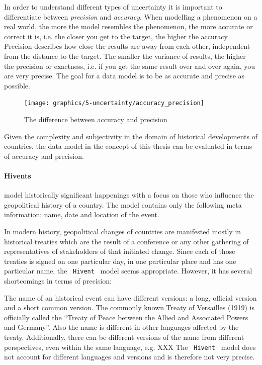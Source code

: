 In order to understand different types of uncertainty it is important to differentiate between \emph{precision} and \emph{accuracy}. When modelling a phenomenon on a real world, the more the model resembles the phenomenon, the more accurate or correct it is, i.e. the closer you get to the target, the higher the accuracy. Precision describes how close the results are away from each other, independent from the distance to the target. The smaller the variance of results, the higher the precision or exactness, i.e. if you get the same result over and over again, you are very precise. The goal for a data model is to be as accurate and precise as possible.

\begin{figure}[ht]
  \centering
  \texttt{[image: graphics/5-uncertainty/accuracy\_precision]}
  \caption{The difference between accuracy and precision}
  \label{fig:accuracy_precision}
\end{figure}

Given the complexity and subjectivity in the domain of historical developments of countries, the data model in the concept of this thesis can be evaluated in terms of accuracy and precision.


\paragraph{Hivents} %
\label{par:evaluation_hivents}

model historically significant happenings with a focus on those who influence the geopolitical history of a country. The model contains only the following meta information: name, date and location of the event.

In modern history, geopolitical changes of countries are manifested mostly in historical treaties which are the result of a conference or any other gathering of representatives of stakeholders of that initiated change. Since each of those treaties is signed on one particular day, in one particular place and has one particular name, the ~\texttt{Hivent}~ model seems appropriate. However, it has several shortcomings in terms of precision:

The name of an historical event can have different versions: a long, official version and a short common version. The commonly known Treaty of Versailles (1919) is officially called the ``Treaty of Peace between the Allied and Associated Powers and Germany''. Also the name is different in other languages affected by the treaty. Additionally, there can be different versions of the name from different perspectives, even within the same language, e.g. XXX %
The ~\texttt{Hivent}~ model does not account for different languages and versions and is therefore not very precise.

